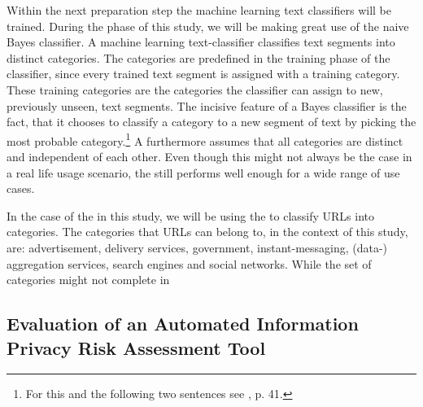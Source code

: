 Within the next preparation step the machine learning text classifiers will be trained.
During the \sca phase of this study, we will be making great use of the naive Bayes classifier.
A machine learning text-classifier classifies text segments into distinct categories. 
The categories are predefined in the training phase of the classifier, since every trained text segment is assigned with a training category.
These training categories are the categories the classifier can assign to new, previously unseen, text segments.
The incisive feature of a Bayes classifier is the fact, that it chooses to classify a category to a new segment of text by picking the most probable category.\footnote{For this and the following two sentences see \cite{Rish2001}, p. 41.}
A \nbc furthermore assumes that all categories are distinct and independent of each other. 
Even though this might not always be the case in a real life usage scenario, the \nbc still performs well enough for a wide range of use cases.

In the case of the \sca in this study, we will be using the \nbc to classify URLs into categories.
The categories that URLs can belong to, in the context of this study, are: advertisement, delivery services, government, instant-messaging, (data-) aggregation services, search engines and social networks.
 While the set of categories might not complete in 


\subsection{Evaluation of an Automated Information Privacy Risk Assessment Tool}